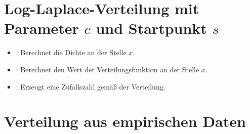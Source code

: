 \section{Log-Laplace-Verteilung mit Parameter \texorpdfstring{$c$}{c} und Startpunkt \texorpdfstring{$s$}{s}}

\begin{itemize}

\item
{}:
Berechnet die Dichte an der Stelle $x$.

\item
{}:
Berechnet den Wert der Verteilungsfunktion an der Stelle $x$.

\item
{}:
Erzeugt eine Zufallszahl gemäß der Verteilung.

\end{itemize}



\section{Verteilung aus empirischen Daten}

